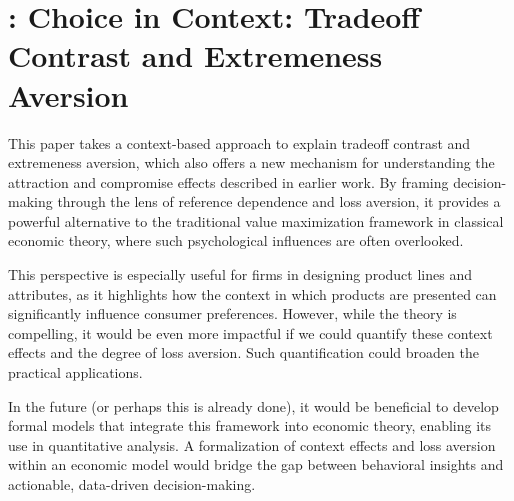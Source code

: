 \documentclass[11pt]{elegantbook}
\begin{document}
\section{\cite{simonson1992choice}: Choice in Context: Tradeoff Contrast and Extremeness Aversion}
This paper takes a context-based approach to explain tradeoff contrast and extremeness aversion, which also offers a new mechanism for understanding the attraction and compromise effects described in earlier work. By framing decision-making through the lens of reference dependence and loss aversion, it provides a powerful alternative to the traditional value maximization framework in classical economic theory, where such psychological influences are often overlooked.

This perspective is especially useful for firms in designing product lines and attributes, as it highlights how the context in which products are presented can significantly influence consumer preferences. However, while the theory is compelling, it would be even more impactful if we could quantify these context effects and the degree of loss aversion. Such quantification could broaden the practical applications.

In the future (or perhaps this is already done), it would be beneficial to develop formal models that integrate this framework into economic theory, enabling its use in quantitative analysis. A formalization of context effects and loss aversion within an economic model would bridge the gap between behavioral insights and actionable, data-driven decision-making.
\end{document}
